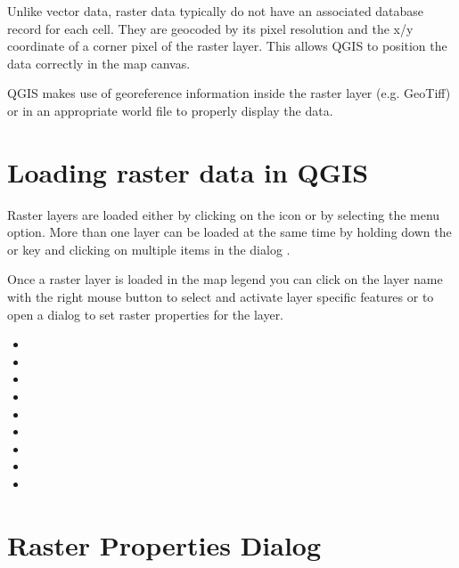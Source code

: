 Unlike vector data, raster data typically do not have an associated database
record for each cell. They are geocoded by its pixel resolution and the x/y
coordinate of a corner pixel of the raster layer. This allows QGIS to position
the data correctly in the map canvas.

QGIS makes use of georeference information inside the raster layer (e.g. GeoTiff)
or in an appropriate world file to properly display the data.

\section{Loading raster data in QGIS}\label{label_loadraster}

Raster layers are loaded either by clicking on the
 icon or by
selecting the  \arrow {}
menu option. More than one layer can be loaded at the same time by holding down the
 or  key and clicking on multiple items
in the dialog .

Once a raster layer is loaded in the map legend you can click on the layer name with the
right mouse button to select and activate layer specific features or to open
a dialog to set raster properties for the layer.


\begin{itemize}[label=--]
\item {}
\item {}
\item {}
\item {}
\item {}
\item {}
\item {}
\item {}
\item {}
\end{itemize}

\section{Raster Properties Dialog}\label{label_rasterprop}

